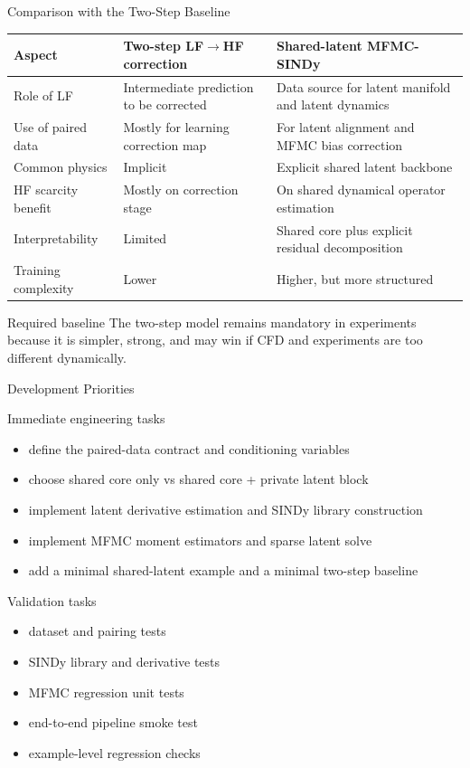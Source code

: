 \documentclass[aspectratio=169]{beamer}
\begin{document}
\begin{frame}{Comparison with the Two-Step Baseline}
\small
\begin{tabular}{p{}p{}p{}}
\toprule
Aspect & Two-step LF$\rightarrow$HF correction & Shared-latent MFMC-SINDy \\
\midrule
Role of LF & Intermediate prediction to be corrected & Data source for latent manifold and latent dynamics \\
Use of paired data & Mostly for learning correction map & For latent alignment and MFMC bias correction \\
Common physics & Implicit & Explicit shared latent backbone \\
HF scarcity benefit & Mostly on correction stage & On shared dynamical operator estimation \\
Interpretability & Limited & Shared core plus explicit residual decomposition \\
Training complexity & Lower & Higher, but more structured \\
\bottomrule
\end{tabular}

\vspace{0.8em}
\begin{alertblock}{Required baseline}
The two-step model remains mandatory in experiments because it is simpler, strong, and may win if CFD and experiments are too different dynamically.
\end{alertblock}
\end{frame}

\begin{frame}{Development Priorities}
\small
\begin{block}{Immediate engineering tasks}
\begin{itemize}
\item define the paired-data contract and conditioning variables
\item choose shared core only vs shared core + private latent block
\item implement latent derivative estimation and SINDy library construction
\item implement MFMC moment estimators and sparse latent solve
\item add a minimal shared-latent example and a minimal two-step baseline
\end{itemize}
\end{block}

\begin{block}{Validation tasks}
\begin{itemize}
\item dataset and pairing tests
\item SINDy library and derivative tests
\item MFMC regression unit tests
\item end-to-end pipeline smoke test
\item example-level regression checks
\end{itemize}
\end{block}
\end{frame}
\end{document}
